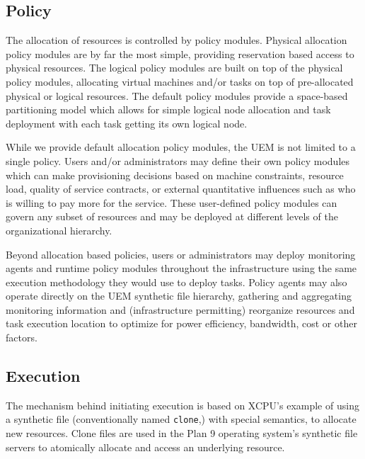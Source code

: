 \documentclass{sig-alternate}
\begin{document}
\subsection{Policy}
\label{section:policy}

The allocation of resources is controlled by policy modules.  Physical
allocation policy modules are by far the most simple, providing reservation 
based access to physical resources.  The logical policy modules are built 
on top of the physical policy modules, allocating virtual machines 
and/or tasks on top of pre-allocated physical or logical resources.
The default policy modules provide a space-based partitioning model which 
allows for simple logical node allocation and task deployment with each
task getting its own logical node.  

While we provide default allocation policy modules, the UEM
is not limited to a single policy.  Users and/or administrators may
define their own policy modules which can make provisioning decisions 
based on machine constraints, resource load, quality of service
contracts, or external quantitative influences such as who is willing
to pay more for the service.   These user-defined policy modules can
govern any subset of resources and may be deployed at different levels
of the organizational hierarchy.

Beyond allocation based policies, users or administrators may deploy
monitoring agents and runtime policy modules throughout the infrastructure
using the same execution methodology they would use to deploy tasks.
Policy agents may also operate directly on the UEM synthetic file hierarchy,
gathering and aggregating monitoring information and (infrastructure
permitting) reorganize resources and task execution location to optimize for
power efficiency, bandwidth, cost or other factors.

\subsection{Execution}
The mechanism behind initiating execution is based on 
XCPU's example of using a synthetic file (conventionally named {\tt clone},) with special semantics, 
to allocate new resources.
Clone files are used in the Plan 9 operating system's synthetic file servers
to atomically allocate and 
access an underlying resource.

\end{document}
